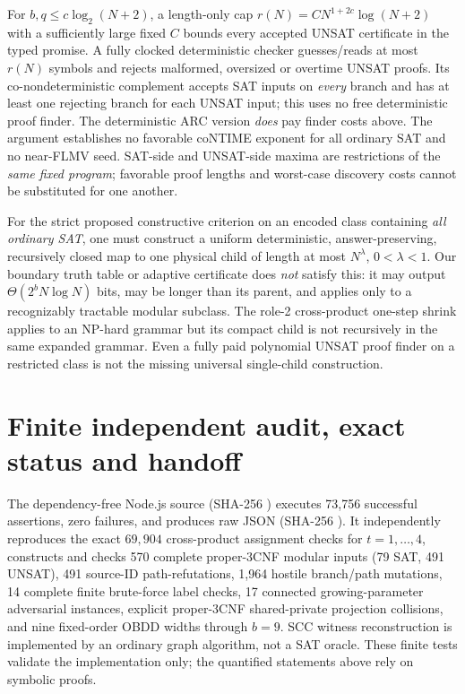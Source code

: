 \documentclass[11pt]{article}
\begin{document}
For $b,q\le c\log_2(N+2)$, a length-only cap $r(N)=C N^{1+2c}\log(N+2)$ with a sufficiently large fixed $C$ bounds every accepted UNSAT certificate in the typed promise. A fully clocked deterministic checker guesses/reads at most $r(N)$ symbols and rejects malformed, oversized or overtime UNSAT proofs. Its co-nondeterministic complement accepts SAT inputs on \emph{every} branch and has at least one rejecting branch for each UNSAT input; this uses no free deterministic proof finder. The deterministic ARC version \emph{does} pay finder costs above. The argument establishes no favorable coNTIME exponent for all ordinary SAT and no near-FLMV seed. SAT-side and UNSAT-side maxima are restrictions of the \emph{same fixed program}; favorable proof lengths and worst-case discovery costs cannot be substituted for one another.

For the strict proposed constructive criterion on an encoded class containing \emph{all ordinary SAT}, one must construct a uniform deterministic, answer-preserving, recursively closed map to one physical child of length at most $N^\lambda$, $0<\lambda<1$. Our boundary truth table or adaptive certificate does \emph{not} satisfy this: it may output $\Theta(2^bN\log N)$ bits, may be longer than its parent, and applies only to a recognizably tractable modular subclass. The role-2 cross-product one-step shrink applies to an NP-hard grammar but its compact child is not recursively in the same expanded grammar. Even a fully paid polynomial UNSAT proof finder on a restricted class is not the missing universal single-child construction.

\section{Finite independent audit, exact status and handoff}
The dependency-free Node.js source  (SHA-256 ) executes 73,756 successful assertions, zero failures, and produces raw JSON (SHA-256 ). It independently reproduces the exact $69,904$ cross-product assignment checks for $t=1,\ldots,4$, constructs and checks 570 complete proper-3CNF modular inputs (79 SAT, 491 UNSAT), 491 source-ID path-refutations, 1,964 hostile branch/path mutations, 14 complete finite brute-force label checks, 17 connected growing-parameter adversarial instances, explicit proper-3CNF shared-private projection collisions, and nine fixed-order OBDD widths through $b=9$. SCC witness reconstruction is implemented by an ordinary graph algorithm, not a SAT oracle. These finite tests validate the implementation only; the quantified statements above rely on symbolic proofs.
\end{document}
